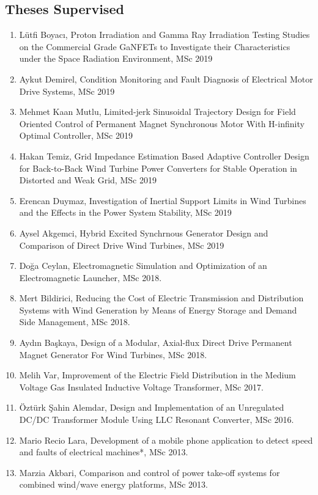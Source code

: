\documentclass[a4paper,12pt]{article}
\begin{document}
\begin{publications}

\section{Theses Supervised}


\begin{enumerate}

\item Lütfi Boyacı, Proton Irradiation and Gamma Ray Irradiation Testing Studies on the Commercial Grade GaNFETs to Investigate their Characteristics under the Space Radiation Environment, MSc 2019
\item Aykut Demirel, Condition Monitoring and Fault Diagnosis of Electrical Motor Drive Systems,  MSc 2019
\item Mehmet Kaan Mutlu, Limited-jerk Sinusoidal Trajectory Design for Field Oriented Control of Permanent Magnet Synchronous Motor With H-infinity Optimal Controller, MSc 2019
\item Hakan Temiz, Grid Impedance Estimation Based Adaptive Controller Design for Back-to-Back Wind Turbine Power Converters for Stable Operation in Distorted and Weak Grid, MSc 2019
\item Erencan Duymaz, Investigation of Inertial Support Limits in Wind Turbines and the Effects in the Power System Stability, MSc 2019
\item Aysel Akgemci, Hybrid Excited Synchrnous Generator Design and Comparison of Direct Drive Wind Turbines, MSc 2019
\item Doğa Ceylan, Electromagnetic Simulation and Optimization of an Electromagnetic Launcher, MSc 2018.
\item Mert Bildirici, Reducing the Cost of Electric Transmission and Distribution Systems with Wind Generation by Means of Energy Storage and Demand Side Management, MSc 2018.
\item Aydın Başkaya, Design of a Modular, Axial-flux Direct Drive Permanent
Magnet Generator For Wind Turbines, MSc 2018.
\item Melih Var, Improvement of the Electric Field Distribution in the Medium Voltage Gas Insulated Inductive Voltage Transformer, MSc 2017.
\item Öztürk Şahin Alemdar, Design and Implementation of an Unregulated DC/DC Transformer Module Using LLC Resonant Converter, MSc 2016. 
\item Mario Recio Lara, Development of a mobile phone application to detect speed and faults of electrical machines*, MSc 2013.
\item Marzia Akbari, Comparison and control of power take-off systems for combined wind/wave energy platforms, MSc 2013.

\end{enumerate}

\end{publications}
\end{document}
